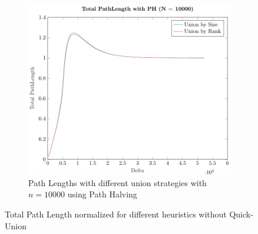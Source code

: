 \begin{figure}[ht]
\begin{subfigure}{0.32\textwidth}
    \end{subfigure}%
    \hfill
    \begin{subfigure}{0.32\textwidth}
        \centering
        \includegraphics[width=\textwidth]{../images/plotPHNonFull10000_PathLength.pdf}
        \caption{Path Lengths with different union strategies with $n = 10000$ using Path Halving}
    \end{subfigure}

    \caption{Total Path Length normalized for different heuristics without Quick-Union}
    \label{fig:tplNH}
\end{figure}
